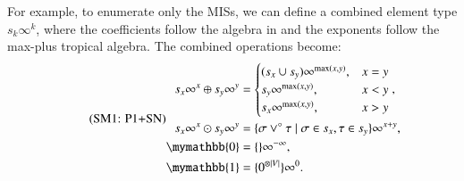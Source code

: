 \documentclass[review, onefignum, onetabnum]{siamart190516}
\begin{document}
For example, to enumerate only the MISs, we can define a combined element type $s_{k}\infty^k$, where the coefficients follow the algebra in  and the exponents follow the max-plus tropical algebra.
The combined operations become: 
\begin{equation}
\eqname{P1+SN}
\begin{split}
    s_x\infty^x \oplus s_y\infty^y &= \begin{cases}
        (s_x \cup s_y)\infty^{\max(x,y)}, & x = y\\
        s_y\infty^{\max(x,y)}, & x < y\\
        s_x\infty^{\max(x,y)}, & x > y
    \end{cases},\\
    s_x\infty^x \odot s_y\infty^y &= \{\sigma \lor^\circ \tau \mid \sigma \in s_x, \tau \in s_y\}\infty^{x+y},\\
    \mymathbb{0} &= \{\}\infty^{-\infty},\\
    \mymathbb{1} &= \{0^{\otimes |V|}\}\infty^{0}. \label{eq:countingtropicalset}
\end{split}
\end{equation}
\end{document}
